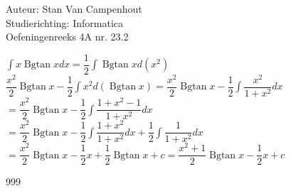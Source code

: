 \documentclass[a4paper]{article}
\begin{document}
  
\noindent \large Auteur: Stan Van Campenhout \\
\noindent \large Studierichting:  Informatica\\
\noindent \large Oefeningenreeks 4A nr. 23.2\\

\medskip

\normalsize

$ \displaystyle\int x \operatorname{Bgtan} x dx = \dfrac{1}{2}\displaystyle\int\operatorname{Bgtan}x d(x^2) $\\

$ \dfrac{x^2}{2}\operatorname{Bgtan}x - \dfrac{1}{2}\displaystyle\int x^2 d\left(\operatorname{Bgtan}x\right)
= \dfrac{x^2}{2}\operatorname{Bgtan}x - \dfrac{1}{2}\displaystyle\int \dfrac{x^2}{1 + x^2} dx $\\

$ = \dfrac{x^2}{2}\operatorname{Bgtan}x - \dfrac{1}{2}\displaystyle\int \dfrac{1 + x^2 - 1}{1 + x^2} dx $\\

$ = \dfrac{x^2}{2}\operatorname{Bgtan}x - \dfrac{1}{2}\displaystyle\int \dfrac{1 + x^2}{1 + x^2} dx 
+ \dfrac{1}{2}\displaystyle\int \dfrac{1}{1 + x^2} dx $\\

$ = \dfrac{x^2}{2}\operatorname{Bgtan}x - \dfrac{1}{2}x + \dfrac{1}{2}\operatorname{Bgtan}x + c  
 = \dfrac{x^2 + 1}{2}\operatorname{Bgtan}x - \dfrac{1}{2}x + c $\\

\begin{thebibliography}{999}
\end{thebibliography}
\end{document}

